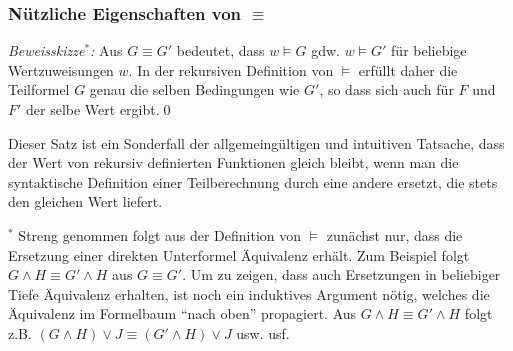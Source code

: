 \documentclass[aspectratio=1610,onlymath]{beamer}
\begin{document}
\begin{frame}\frametitle{Nützliche Eigenschaften von $\equiv$}

% 


\pause

\emph{Beweisskizze${}^*$:} Aus $G\equiv G'$ bedeutet, dass $w\models G$ gdw. $w\models G'$ für beliebige Wertzuweisungen $w$.
In der rekursiven Definition von $\models$ erfüllt daher die Teilformel $G$ genau die selben Bedingungen wie $G'$, so
dass sich auch für $F$ und $F'$ der selbe Wert ergibt.\qed
\bigskip

Dieser Satz ist ein Sonderfall der allgemeingültigen und intuitiven Tatsache, dass der Wert von rekursiv definierten Funktionen gleich bleibt, wenn man die syntaktische Definition einer Teilberechnung durch eine andere ersetzt, die stets den gleichen Wert liefert.
\bigskip


{\tiny ${}^*$ Streng genommen folgt aus der Definition von $\models$ zunächst nur, dass die Ersetzung einer direkten Unterformel
Äquivalenz erhält. Zum Beispiel folgt $G\wedge H\equiv G'\wedge H$ aus $G\equiv G'$. Um zu zeigen, dass auch Ersetzungen in beliebiger Tiefe Äquivalenz erhalten, ist noch ein induktives Argument nötig, welches die Äquivalenz im Formelbaum "`nach oben"' propagiert. Aus $G\wedge H\equiv G'\wedge H$ folgt z.B. $(G\wedge H)\vee J\equiv (G'\wedge H)\vee J$ usw. usf.
}

\end{frame}
\end{document}
